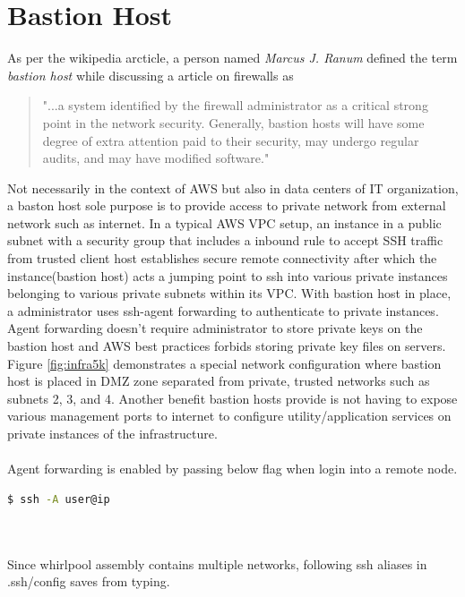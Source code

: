 \section{Bastion Host}
As per the wikipedia arcticle, a person named \emph{Marcus J. Ranum} defined the term \emph{bastion host} while discussing a article on firewalls as 
\begin{quote}
  "...a system identified by the firewall administrator as a critical strong point in the network security.
  Generally, bastion hosts will have some degree of extra attention paid to their security, may undergo
  regular audits, and may have modified software."
\end{quote}
Not necessarily in the context of AWS but also in data centers of IT organization, a baston host sole
purpose is to provide access to private network from external network such as internet. In a typical
AWS VPC setup, an instance in a public subnet with a security group that includes a inbound rule to
accept SSH traffic from trusted client host establishes secure remote connectivity after which the
instance(bastion host) acts a jumping point to ssh into various private instances belonging to various
private subnets within its VPC. With bastion host in place, a administrator uses ssh-agent
forwarding to authenticate to private instances. Agent forwarding doesn't require administrator to store
private keys on the bastion host and AWS best practices forbids storing private key files on servers.
Figure \ref{fig:infra5k} demonstrates a special network configuration where bastion host is placed in
DMZ zone separated from private, trusted networks such as subnets 2, 3, and 4. Another benefit bastion
hosts provide is not having to expose various management ports to internet to configure
utility/application services on private instances of the infrastructure.
\\
\\
\noindent
Agent forwarding is enabled by passing below flag when login into a remote node.

\begin{lstlisting}[language=bash]
  $ ssh -A user@ip
\end{lstlisting}
\\
\\
\noindent
Since whirlpool assembly contains multiple networks, following ssh aliases in .ssh/config saves from
typing.

